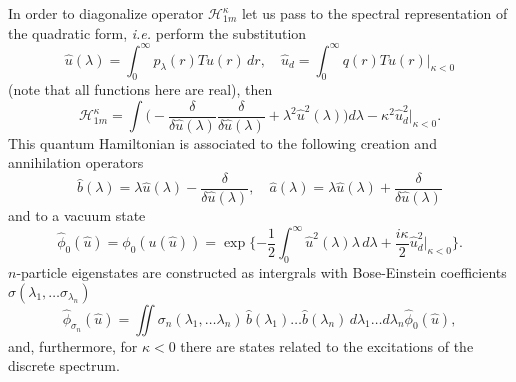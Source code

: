 \documentclass[12pt]{article}
\newcommand{\HH}{\mathscr{H}}
\begin{document}
	In order to diagonalize operator
$ \HH_{1m}^{\kappa} $
	let us pass to the spectral representation of the quadratic form,
	{\it i.e.} perform the substitution
\begin{equation*}
    \hat{u}(\lambda) = \int_{0}^{\infty} p_{\lambda}(r) T u(r)\,dr, \quad
	\hat{u}_{d} =  \int_{0}^{\infty} q(r) T u(r) \bigr|_{\kappa<0}
\end{equation*}
	(note that all functions here are real), then
\begin{equation*}
    \HH_{1m}^{\kappa} = \int \bigl(
-\frac{\delta}{\delta \hat{u}(\lambda)} \frac{\delta}{\delta \hat{u}(\lambda)}
	+ \lambda^{2} \hat{u}^{2}(\lambda) \bigr)d\lambda
	- \kappa^{2} \hat{u}_{d}^{2} \bigr|_{\kappa <0} .
\end{equation*}
	This quantum Hamiltonian is associated to the following
	creation and annihilation operators
\begin{equation*}
    \hat{b}(\lambda) = \lambda \hat{u}(\lambda)
	- \frac{\delta}{\delta \hat{u}(\lambda)} ,\quad
    \hat{a}(\lambda) = \lambda \hat{u}(\lambda) 
	+ \frac{\delta}{\delta \hat{u}(\lambda)}
\end{equation*}
	and to a vacuum state
\begin{equation*}
    \hat{\phi}_{0}(\hat{u}) = \phi_{0}(u(\hat{u})) = \exp\{-\frac{1}{2}
	\int_{0}^{\infty} \hat{u}^{2}(\lambda) \lambda \,d\lambda
	+\frac{i\kappa}{2} \hat{u}_{d}^{2} \bigr|_{\kappa < 0}\} .
\end{equation*}
$ n $-particle eigenstates are constructed as intergrals with Bose-Einstein
	coefficients
$ \sigma(\lambda_{1},\ldots \sigma_{\lambda_{n}}) $
\begin{equation}
\label{hatphi}
    \hat{\phi}_{\sigma_{n}}(\hat{u}) = \iint
    \sigma_{n} (\lambda_{1},\ldots \lambda_{n}) \,
	\hat{b}(\lambda_{1}) \ldots \hat{b}(\lambda_{n}) \,
    d\lambda_{1} \ldots d\lambda_{n} \hat{\phi}_{0}(\hat{u}) ,
\end{equation}
	and, furthermore, for
$ \kappa < 0 $
	there are states related to the excitations of the discrete spectrum.



\end{document}
